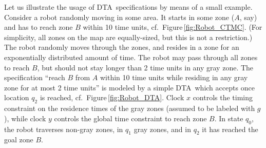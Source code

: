 \documentclass{LMCS}
\newcommand{\<}{\langle}
\renewcommand{\>}{\rangle}
\newcommand{\DTA}{\textsc{DTA}}
\begin{document}
\begin{exa}
Let us illustrate the usage of \DTA\ specifications by means of a small example.
Consider a robot randomly moving in some area. It starts in some zone ($A$, say)
and has to reach zone $B$ within 10 time units, cf.\ Figure\,\ref{fig:Robot_CTMC}.
(For simplicity, all zones on the map are equally-sized, but this is not a restriction.)
The robot randomly moves through the zones, and resides in a zone for an
exponentially distributed amount of time.
The robot may pass through all zones to reach $B$, but should not stay longer
than 2 time units in any gray zone.
The specification ``reach $B$ from $A$ within 10 time units while residing in any
gray zone for at most 2 time units'' is modeled by a simple \DTA\ which accepts
once location $q_2$ is reached, cf.\ Figure\,\ref{fig:Robot_DTA}.
Clock $x$ controls the timing constraint on the residence times of the gray zones
(assumed to be labeled with $g$), while clock $y$ controls the global time constraint
to reach zone $B$.
In state $q_0$, the robot traverses non-gray zones, in $q_1$ gray zones, and in
$q_2$ it has reached the goal zone $B$.
\begin{figure}[h]
\begin{center}
\hspace{-0.7cm}
\end{center}
\end{figure}
\end{exa}
\end{document}
